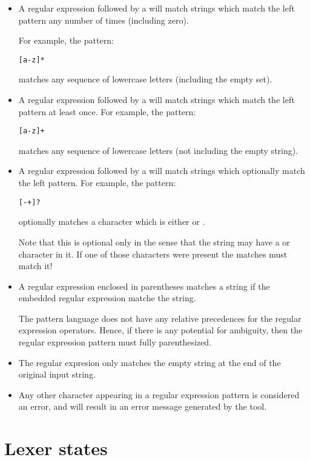 \begin{itemize}
\item
A regular expression followed by a \q{*} will match strings which match the left pattern any number of times (including zero). 

For example, the pattern:
\begin{alltt}
[a-z]*
\end{alltt}
matches any sequence of lowercase letters (including the empty set).

\item
A regular expression followed by a \q{+} will match strings which match the left pattern at least once.
For example, the pattern:
\begin{alltt}
[a-z]+
\end{alltt}
matches any sequence of lowercase letters (not including the empty string).

\item
A regular expression followed by a  will match strings which optionally match the left pattern.
For example, the pattern:
\begin{alltt}
[-+]?
\end{alltt}
optionally matches a character which is either \q{-} or \q{+}.

Note that this is optional only in the sense that the string may have a \q{-} or \q{+} character in it. If one of those characters were present the matches must match it!

\item
A regular expression enclosed in parentheses matches a string if the embedded regular expression matche the string.

\begin{aside}
The pattern language does not have any relative precedences for the regular expression operators. Hence, if there is any potential for ambiguity, then the regular expression pattern must fully parenthesized.
\end{aside}

\item
The regular expresion  only matches the empty string at the end of the original input string.

\item
Any other character appearing in a regular expression pattern is considered an error, and will result in an error message generated by the \golex tool.
\end{itemize}


\section{Lexer states}
\label{golex:states}

